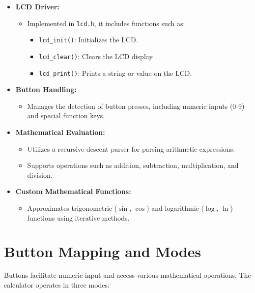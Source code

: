 \begin{itemize}
    \item \textbf{LCD Driver:}  
    \begin{itemize}
        \item Implemented in \texttt{lcd.h}, it includes functions such as:  
        \begin{itemize}
            \item \texttt{lcd\_init()}: Initializes the LCD.  
            \item \texttt{lcd\_clear()}: Clears the LCD display.  
            \item \texttt{lcd\_print()}: Prints a string or value on the LCD.  
        \end{itemize}
    \end{itemize}
    
    \item \textbf{Button Handling:}  
    \begin{itemize}
        \item Manages the detection of button presses, including numeric inputs (0-9) and special function keys.  
    \end{itemize}
    
    \item \textbf{Mathematical Evaluation:}  
    \begin{itemize}
        \item Utilizes a recursive descent parser for parsing arithmetic expressions.  
        \item Supports operations such as addition, subtraction, multiplication, and division.  
    \end{itemize}
    
    \item \textbf{Custom Mathematical Functions:}  
    \begin{itemize}
        \item Approximates trigonometric (\(\sin\), \(\cos\)) and logarithmic (\(\log\), \(\ln\)) functions using iterative methods.  
    \end{itemize}
\end{itemize}

\section*{Button Mapping and Modes}

Buttons facilitate numeric input and access various mathematical operations. The calculator operates in three modes:  

